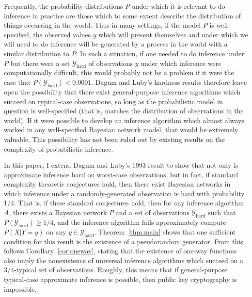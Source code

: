 \documentclass{article}
\theoremstyle{definition}
\theoremstyle{remark}
\begin{document}
Frequently, the probability distributions $P$ under which it is relevant to do inference in practice are those which to some extent describe the distribution of things occurring in the world.
Thus in many settings, if the model $P$ is well-specified, the observed values $y$ which will present themselves and under which we will need to do inference will be generated by a process in the world with a similar distribution to $P$.
In such a situation, if one needed to do inference under $P$ but there were a set $\mathcal{Y}_\text{hard}$ of observations $y$ under which inference were computationally difficult, this would probably not be a problem if it were the case that $P(\mathcal{Y}_\text{hard}) < 0.0001$.
Dagum and Luby's hardness results therefore leave open the possibility that there exist general-purpose inference algorithms which succeed on typical-case observations, so long as the probabilistic model in question is well-specified (that is, matches the distribution of observations in the world).
If it were possible to develop an inference algorithm which almost always worked in any well-specified Bayesian network model, that would be extremely valuable.
This possibility has not been ruled out by existing results on the complexity of probabilistic inference.

In this paper, I extend Dagum and Luby's 1993 result \cite{dagum1993} to show that not only is approximate inference hard on worst-case observations, but in fact, if standard complexity theoretic conjectures hold, then there exist Bayesian networks in which inference under a randomly-generated observation is hard with probability 1/4.
That is, if these standard conjectures hold, then for any inference algorithm $A$, there exists a Bayesian network $P$ and a set of observations $\mathcal{Y}_\text{hard}$ such that $P(\mathcal{Y}_\text{hard}) \geq 1/4$, and the inference algorithm fails approximately compute $P(X | Y = y)$ on any $y \in \mathcal{Y}_\text{hard}$.
Theorem~\ref{thm:main} shows that one sufficient condition for this result is the existence of a pseudorandom generator.
From this follows Corollary~\ref{cor:oneway}, stating that the existence of one-way functions also imply the nonexistence of universal inference algorithms which succeed on a $3/4$-typical set of observations.
Roughly, this means that if general-purpose typical-case approximate inference is possible, then public key cryptography is impossible.
\end{document}
